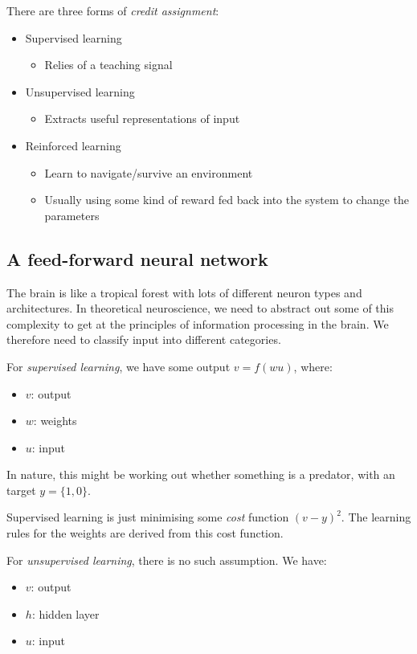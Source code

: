\documentclass[11pt,a4paper,titlepage,dvipsnames,cmyk]{scrartcl}
\begin{document}
There are three forms of \textit{credit assignment}:
\begin{itemize}
    \item Supervised learning
    \begin{itemize}
        \item Relies of a teaching signal
    \end{itemize}
    \item Unsupervised learning
    \begin{itemize}
        \item Extracts useful representations of input
    \end{itemize}
    \item Reinforced learning
    \begin{itemize}
        \item Learn to navigate/survive an environment
        \item Usually using some kind of reward fed back into the system to change the parameters
    \end{itemize}
\end{itemize}

\subsection{A feed-forward neural network}
The brain is like a tropical forest with lots of different neuron types and architectures. In theoretical neuroscience, we need to abstract out some of this complexity to get at the principles of information processing in the brain. We therefore need to classify input into different categories.

For \textit{supervised learning}, we have some output $v = f(wu)$, where:
\begin{itemize}
    \item $v$: output
    \item $w$: weights
    \item $u$: input
\end{itemize}

In nature, this might be working out whether something is a predator, with an target $y = \{1,0\}$.

Supervised learning is just minimising some \textit{cost} function $(v-y)^2$. The learning rules for the weights are derived from this cost function.

For \textit{unsupervised learning}, there is no such assumption. We have:
\begin{itemize}
    \item $v$: output
    \item $h$: hidden layer
    \item $u$: input
\end{itemize}
\end{document}
